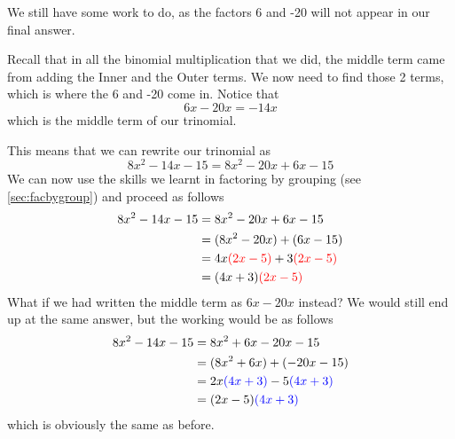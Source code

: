 \begin{myProof}
	We still have some work to do, as the factors 6 and -20 will not appear in our final answer. 
				
	Recall that in all the binomial multiplication that we did, the middle term came from adding the Inner and the Outer terms. We now need
	to find those 2 terms, which is where the 6 and -20 come in. Notice that
	\[
		6x-20x = -14x
	\]
	which is the middle term of our trinomial. 
				
	This means that we can rewrite our trinomial as
	\[
		8x^2 - 14x-15 = 8x^2 -20x+6x-15
	\]
	We can now use the skills we learnt in factoring by grouping (see \vref{sec:facbygroup}) and proceed as follows
	\begin{align*}
		8x^2 - 14x-15 & =		8x^2-20x+6x-15                             \\
		              & =		(8x^2-20x)+(6x-15)                         \\
		              & =		4x{\color{red}(2x-5)}+3{\color{red}(2x-5)} \\
		              & =		(4x+3){\color{red}(2x-5)}                  
	\end{align*} 
	What if we had written the middle term as $6x-20x$ instead? We would still end up at the same answer, but the
	working would be as follows
	\begin{align*}
		8x^2-14x-15 & =		8x^2+6x-20x-15                               \\
		            & =		(8x^2+6x)+(-20x-15)                          \\
		            & =		2x{\color{blue}(4x+3)}-5{\color{blue}(4x+3)} \\
		            & =		(2x-5){\color{blue}(4x+3)}{}                 
	\end{align*} 
	which is obviously the same as before.
\end{myProof} 

